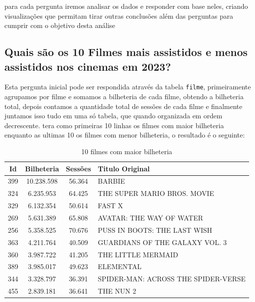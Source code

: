 \documentclass[12pt, a4paper]{article}
\begin{document}
para cada pergunta iremos analisar os dados e responder com base neles, criando visualizações que permitam tirar outras conclusões além das perguntas para cumprir com o objetivo desta análise  

\subsection{Quais são os 10 Filmes mais assistidos e menos assistidos nos cinemas em 2023?}

Esta pergunta inicial pode ser respondida através da tabela \texttt{filme}, primeiramente agrupamos por filme e somamos a bilheteria de cada filme, obtendo a bilheteria total, depois contamos a quantidade total de sessões de cada filme e finalmente juntamos isso tudo em uma só tabela, que quando organizada em ordem decrescente. tera como primeiras 10 linhas os filmes com maior bilheteria enquanto as ultimas 10 os filmes com menor bilheteria, o resultado é o seguinte:

\begin{table}[h]
    \centering
    \begin{tabular}{c|c|c|l}
    \hline
    Id &	Bilheteria&	Sessões&	Titulo Original\\
    \hline
    399&	10.238.598&	56.364&	BARBIE\\
    324&	6.235.953&	64.425&	THE SUPER MARIO BROS. MOVIE\\
    329&	6.132.354&	50.614&	FAST X\\
    \hline
    269&	5.631.389&	65.808&	AVATAR: THE WAY OF WATER\\
    256&	5.358.525&	70.676&	PUSS IN BOOTS: THE LAST WISH\\
    363&	4.211.764&	40.509&	GUARDIANS OF THE GALAXY VOL. 3\\
    \hline
    360&	3.987.722&	41.205&	THE LITTLE MERMAID\\
    389&	3.985.017&	49.623&	ELEMENTAL\\
    344&	3.328.797&	36.391&	SPIDER-MAN: ACROSS THE SPIDER-VERSE\\
    455&	2.839.181&	36.641&	THE NUN 2\\

    \end{tabular}
    \caption{10 filmes com maior bilheteria}
    \label{tab:maiorbilheteria}
\end{table}
\end{document}
